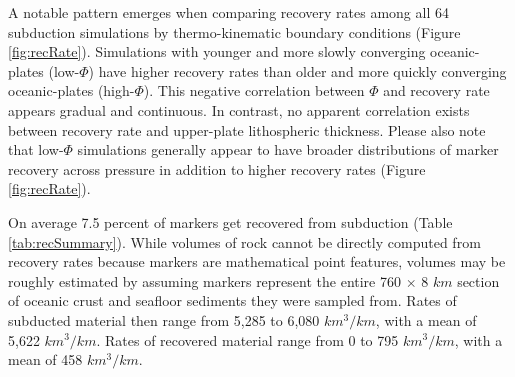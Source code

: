 A notable pattern emerges when comparing recovery rates among all 64 subduction simulations by thermo-kinematic boundary conditions (Figure \ref{fig:recRate}). Simulations with younger and more slowly converging oceanic-plates (low-\(\Phi\)) have higher recovery rates than older and more quickly converging oceanic-plates (high-\(\Phi\)). This negative correlation between \(\Phi\) and recovery rate appears gradual and continuous. In contrast, no apparent correlation exists between recovery rate and upper-plate lithospheric thickness. Please also note that low-\(\Phi\) simulations generally appear to have broader distributions of marker recovery across pressure in addition to higher recovery rates (Figure \ref{fig:recRate}).

On average 7.5 percent of markers get recovered from subduction (Table \ref{tab:recSummary}). While volumes of rock cannot be directly computed from recovery rates because markers are mathematical point features, volumes may be roughly estimated by assuming markers represent the entire 760 \(\times\) 8 \(km\) section of oceanic crust and seafloor sediments they were sampled from. Rates of subducted material then range from 5,285 to 6,080 \(km^3/km\), with a mean of 5,622 \(km^3/km\). Rates of recovered material range from 0 to 795 \(km^3/km\), with a mean of 458 \(km^3/km\).



